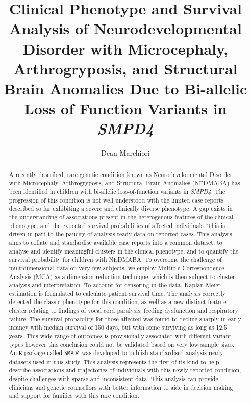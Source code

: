 \documentclass[
  authoryear,
  preprint,
  3p]{elsarticle}
\begin{document}
\begin{frontmatter}
\title{Clinical Phenotype and Survival Analysis of Neurodevelopmental
Disorder with Microcephaly, Arthrogryposis, and Structural Brain
Anomalies Due to Bi-allelic Loss of Function Variants in \emph{SMPD4}}
\author[]{Dean Marchiori%
%
}



        
\begin{abstract}
A recently described, rare genetic condition known as Neurodevelopmental
Disorder with Microcephaly, Arthrogryposis, and Structural Brain
Anomalies (NEDMABA) has been identified in children with bi-allelic
loss-of-function variants in \emph{SMPD4}. The progression of this
condition is not well understood with the limited case reports described
so far exhibiting a severe and clinically diverse phenotype. A gap
exists in the understanding of associations present in the heterogenous
features of the clinical phenotype, and the expected survival
probabilities of affected individuals. This is driven in part to the
paucity of analysis-ready data on reported cases. This analysis aims to
collate and standardise available case reports into a common dataset, to
analyse and identify meaningful clusters in the clinical phenotype, and
to quantify the survival probability for children with NEDMABA. To
overcome the challenge of multidimensional data on very few subjects, we
employ Multiple Correspondence Analysis (MCA) as a dimension reduction
technique, which is then subject to cluster analysis and interpretation.
To account for censoring in the data, Kaplan-Meier estimation is
formulated to calculate patient survival time. The analysis correctly
detected the classic phenotype for this condition, as well as a new
distinct feature-cluster relating to findings of vocal cord paralysis,
feeding dysfunction and respiratory failure. The survival probability
for those affected was found to decline sharply in early infancy with
median survival of 150 days, but with some surviving as long as 12.5
years. This wide range of outcomes is provisionally associated with
different variant types however this conclusion could not be validated
based on very low sample sizes. An \texttt{R} package called
\texttt{SMPD4} was developed to publish standardised analysis-ready
datasets used in this study. This analysis represents the first of its
kind to help describe associations and trajectories of individuals with
this newly reported condition, despite challenges with sparse and
inconsistent data. This analysis can provide clinicians and genetic
counsellors with better information to aide in decision making and
support for families with this rare condition.
\end{abstract}






\end{frontmatter}
\end{document}
